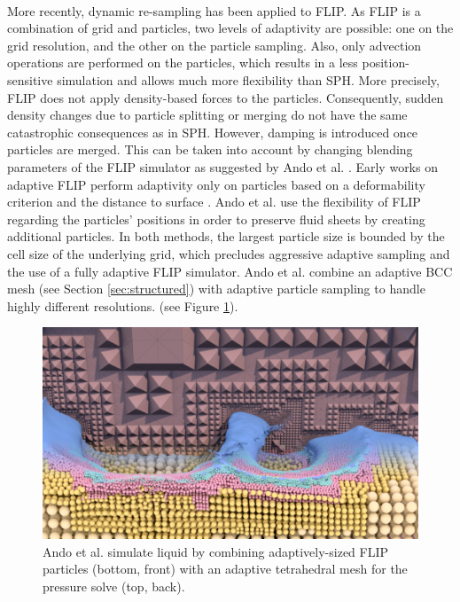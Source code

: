\paragraph*{}
More recently, dynamic re-sampling has been applied to FLIP. As FLIP is a combination of grid and particles, two levels of adaptivity are possible: one on the grid resolution, and the other on the particle sampling. Also, only advection operations are performed on the particles, which results in a less position-sensitive simulation and allows much more flexibility than SPH. More precisely, FLIP does not apply density-based forces to the particles. Consequently, sudden density changes due to particle splitting or merging do not have the same catastrophic consequences as in SPH. However, damping is introduced once particles are merged. This can be taken into account by changing blending parameters of the FLIP simulator as suggested by Ando et al. \cite{Ando2012}.
Early works on adaptive FLIP perform adaptivity only on particles based on a deformability criterion and the distance to surface \cite{Hong2008FLIP, Ando2012}. Ando et al. use the flexibility of FLIP regarding the particles' positions in order to preserve fluid sheets by creating additional particles.
In both methods, the largest particle size is bounded by the cell size of the underlying grid, which precludes aggressive adaptive sampling and the use of a fully adaptive FLIP simulator. Ando et al. \cite{Ando2013} combine an adaptive BCC mesh (see Section \ref{sec:structured}) with adaptive particle sampling to handle highly different resolutions. (see Figure \ref{fig:Ando2013}).
\begin{figure}[t]
	\centering
	\includegraphics[width=0.8\linewidth]{images/starAdaptivity-cgf2016/Ando2013_3.png}
	\caption[STAR adaptivity: Hybrid refinement of meshes and particles]{Ando et al. \cite{Ando2013} simulate liquid by combining adaptively-sized FLIP particles (bottom, front) with an adaptive tetrahedral mesh for the pressure solve (top, back).}
	\label{fig:Ando2013}
\end{figure}
